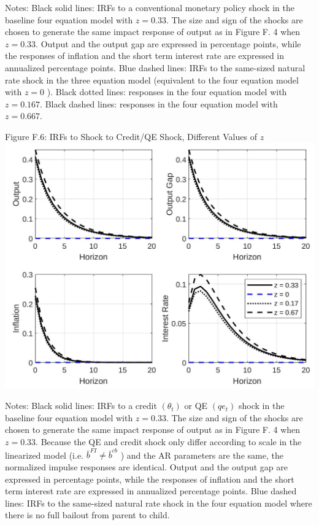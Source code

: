 \documentclass[10pt]{article}
\begin{document}
Notes: Black solid lines: IRFs to a conventional monetary policy shock in the baseline four equation model with $z=0.33$. The size and sign of the shocks are chosen to generate the same impact response of output as in Figure F. 4 when $z=0.33$. Output and the output gap are expressed in percentage points, while the responses of inflation and the short term interest rate are expressed in annualized percentage points. Blue dashed lines: IRFs to the same-sized natural rate shock in the three equation model (equivalent to the four equation model with $z=0$ ). Black dotted lines: responses in the four equation model with $z=0.167$. Black dashed lines: responses in the four equation model with $z=0.667$.

Figure F.6: IRFs to Shock to Credit/QE Shock, Different Values of $z$\\
\includegraphics[max width=\textwidth, center]{2024_12_20_23d1456f4ac472ebd83dg-16}

Notes: Black solid lines: IRFs to a credit $\left(\theta_{t}\right)$ or QE $\left(q e_{t}\right)$ shock in the baseline four equation model with $z=0.33$. The size and sign of the shocks are chosen to generate the same impact response of output as in Figure F. 4 when $z=0.33$. Because the QE and credit shock only differ according to scale in the linearized model (i.e. $\bar{b}^{F I} \neq \bar{b}^{c b}$ ) and the AR parameters are the same, the normalized impulse responses are identical. Output and the output gap are expressed in percentage points, while the responses of inflation and the short term interest rate are expressed in annualized percentage points. Blue dashed lines: IRFs to the same-sized natural rate shock in the four equation model where there is no full bailout from parent to child.
\end{document}
